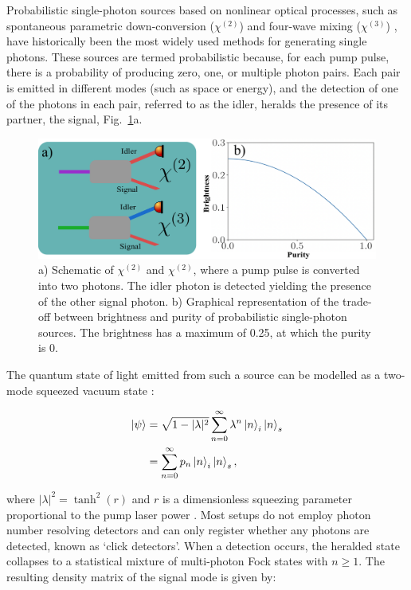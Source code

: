 Probabilistic single-photon sources based on nonlinear optical processes, such as spontaneous parametric down-conversion ($\chi^{(2)}$) and four-wave mixing ($\chi^{(3)}$) \cite{Chopin2023}, have historically been the most widely used methods for generating single photons. These sources are termed probabilistic because, for each pump pulse, there is a probability of producing zero, one, or multiple photon pairs. Each pair is emitted in different modes (such as space or energy), and the detection of one of the photons in each pair, referred to as the idler, heralds the presence of its partner, the signal, Fig.~\ref{fig:SPCD-FWM}a.

\begin{figure}[h]
    \centering
    \includegraphics[width=0.9\linewidth]{Figures/SPDC-FWM.png}
    \caption{a) Schematic of $\chi^{(2)}$ and $\chi^{(2)}$, where a pump pulse is converted into two photons. The idler photon is detected yielding the presence of the other signal photon. b) Graphical representation of the trade-off between brightness and purity of probabilistic single-photon sources. The brightness has a maximum of 0.25, at which the purity is 0.}
    \label{fig:SPCD-FWM}
\end{figure}

The quantum state of light emitted from such a source can be modelled as a two-mode squeezed vacuum state \cite{Braunstein2005}:

\begin{equation}
\begin{aligned}
    |\psi\rangle &= \sqrt{1 - |\lambda|^2} \sum_{n=0}^{\infty} \lambda^n  \ket{n}_i\ket{n}_s \\
    &= \sum_{n=0}^{\infty} p_n \ket{n}_i\ket{n}_s,
    \label{eqn:squeezed_state_model}
\end{aligned}
\end{equation}

where $|\lambda|^2 = \tanh^2(r)$ and $r$ is a dimensionless squeezing parameter proportional to the pump laser power \cite{Braunstein2005}. Most setups do not employ photon number resolving detectors and can only register whether any photons are detected, known as `click detectors'. When a detection occurs, the heralded state collapses to a statistical mixture of multi-photon Fock states with $n \geq 1$. The resulting density matrix of the signal mode is given by:

